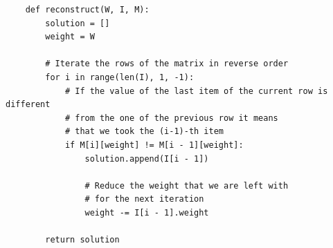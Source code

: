 \documentclass[12pt]{extarticle}
\begin{document}
\begin{verbatim}
    def reconstruct(W, I, M):
        solution = []
        weight = W

        # Iterate the rows of the matrix in reverse order
        for i in range(len(I), 1, -1):
            # If the value of the last item of the current row is different
            # from the one of the previous row it means 
            # that we took the (i-1)-th item
            if M[i][weight] != M[i - 1][weight]:
                solution.append(I[i - 1])

                # Reduce the weight that we are left with
                # for the next iteration
                weight -= I[i - 1].weight
        
        return solution
\end{verbatim}
\end{document}
